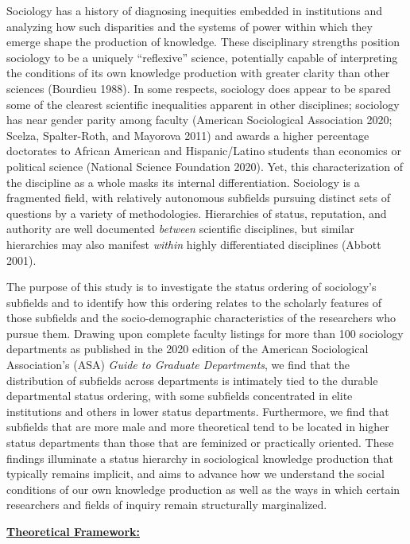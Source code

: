 \documentclass{article}
\begin{document}
Sociology has a history of diagnosing inequities embedded in
institutions and analyzing how such disparities and the systems of power
within which they emerge shape the production of knowledge. These
disciplinary strengths position sociology to be a uniquely ``reflexive''
science, potentially capable of interpreting the conditions of its own
knowledge production with greater clarity than other sciences (Bourdieu
1988). In some respects, sociology does appear to be spared some of the
clearest scientific inequalities apparent in other disciplines;
sociology has near gender parity among faculty (American Sociological
Association 2020; Scelza, Spalter-Roth, and Mayorova 2011) and awards a
higher percentage doctorates to African American and Hispanic/Latino
students than economics or political science (National Science
Foundation 2020). Yet, this characterization of the discipline as a
whole masks its internal differentiation. Sociology is a fragmented
field, with relatively autonomous subfields pursuing distinct sets of
questions by a variety of methodologies. Hierarchies of status,
reputation, and authority are well documented \emph{between} scientific
disciplines, but similar hierarchies may also manifest \emph{within}
highly differentiated disciplines (Abbott 2001).

The purpose of this study is to investigate the status ordering of
sociology's subfields and to identify how this ordering relates to the
scholarly features of those subfields and the socio-demographic
characteristics of the researchers who pursue them. Drawing upon
complete faculty listings for more than 100 sociology departments as
published in the 2020 edition of the American Sociological Association's
(ASA) \emph{Guide to Graduate Departments}, we find that the
distribution of subfields across departments is intimately tied to the
durable departmental status ordering, with some subfields concentrated
in elite institutions and others in lower status departments.
Furthermore, we find that subfields that are more male and more
theoretical tend to be located in higher status departments than those
that are feminized or practically oriented. These findings illuminate a
status hierarchy in sociological knowledge production that typically
remains implicit, and aims to advance how we understand the social
conditions of our own knowledge production as well as the ways in which
certain researchers and fields of inquiry remain structurally
marginalized.

\textbf{\uline{Theoretical Framework:}}
\end{document}
